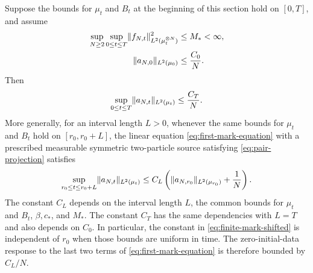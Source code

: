 \documentclass[11pt,reqno]{amsart}
\numberwithin{equation}{section}
\theoremstyle{plain}
\theoremstyle{remark}
\DeclarePairedDelimiter{\norm}{\lVert}{\rVert}
\begin{document}
\begin{prop}\label{prop:finite-mark}
Suppose the bounds for $\mu_t$ and $B_t$ at the beginning of this section hold on $[0,T]$, and assume
\begin{align}
 \sup_{N\ge2}\sup_{0\le t\le T}
       \norm{f_{N,t}}_{L^2(\mu_t^{\otimes N})}^2&\le M_*<\infty,
              \label{eq:finite-mark-assumptions}\\
 \norm{a_{N,0}}_{L^2(\mu_0)}&\le\frac{C_0}N.
              \label{eq:finite-mark-initial}
\end{align}
Then
\begin{equation}\label{eq:finite-mark}
 \sup_{0\le t\le T}\norm{a_{N,t}}_{L^2(\mu_t)}\le\frac{C_T}N.
\end{equation}
More generally, for an interval length $L>0$, whenever the same bounds for $\mu_t$ and $B_t$ hold on $[r_0,r_0+L]$, the linear equation \eqref{eq:first-mark-equation} with a prescribed measurable symmetric two-particle source satisfying \eqref{eq:pair-projection} satisfies
\begin{equation}\label{eq:finite-mark-shifted}
 \sup_{r_0\le t\le r_0+L}\norm{a_{N,t}}_{L^2(\mu_t)}
 \le C_L\left(\norm{a_{N,r_0}}_{L^2(\mu_{r_0})}+\frac1N\right).
\end{equation}
The constant $C_L$ depends on the interval length $L$, the common bounds for $\mu_t$ and $B_t$, $\beta,c_*$, and $M_*$. The constant $C_T$ has the same dependencies with $L=T$ and also depends on $C_0$. In particular, the constant in \eqref{eq:finite-mark-shifted} is independent of $r_0$ when those bounds are uniform in time. The zero-initial-data response to the last two terms of \eqref{eq:first-mark-equation} is therefore bounded by $C_L/N$.
\end{prop}
\end{document}
